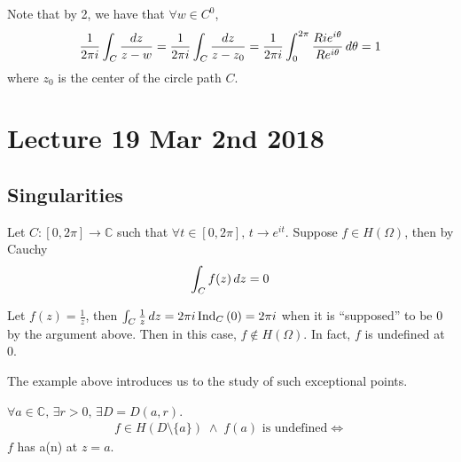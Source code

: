 \documentclass[11pt, oneside]{book}
\begin{document}
\begin{remark}
	Note that by 2, we have that $\forall w \in C^0$,
	\begin{equation*}
		\frac{1}{2 \pi i} \int_{C} \frac{\dif{z}}{z - w} = \frac{1}{2 \pi i} \int_{C} \frac{\dif{z}}{z - z_0} = \frac{1}{2 \pi i } \int_{0}^{2 \pi} \frac{Rie^{i \theta}}{Re^{i \theta}} \dif{\theta} = 1  
	\end{equation*}
	where $z_0$ is the center of the circle path $C$.
\end{remark}



\chapter{Lecture 19 Mar 2nd 2018}
	\label{chapter:lecture_19_mar_2nd_2018}

\section{Singularities} %
\label{sec:singularities}

\begin{ex}
	Let $C : [0, 2 \pi] \to \mathbb{C}$ such that $\forall t \in [0, 2 \pi], \, t \to e^{it}$. Suppose $f \in H(\Omega)$, then by Cauchy
	\begin{equation*}
		\int_{C} f(z) \dif{z} = 0
	\end{equation*}

	Let $f(z) = \frac{1}{z}$, then $\int_{C} \frac{1}{z} \dif{z} = 2 \pi i \ind{0}{C} = 2 \pi i$ when it is ``supposed'' to be $0$ by the argument above. Then in this case, $f \notin H(\Omega)$. In fact, $f$ is undefined at $0$.
\end{ex}

The example above introduces us to the study of such exceptional points.

\begin{defn}\label{defn:singularity}
	$\forall a \in \mathbb{C}, \, \exists r > 0 , \, \exists D = D(a, r)$.
	\begin{gather*}
		f \in H(D \setminus \{a\}) \; \land \; f(a) \text{ is undefined} \iff
	\end{gather*}
	$f$ has a(n)  at $z = a$.
\end{defn}
\end{document}
